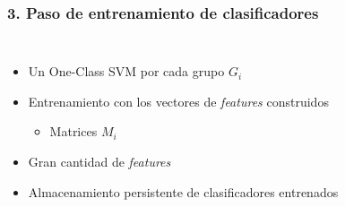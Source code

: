 \begin{frame}
    \frametitle{3. Paso de entrenamiento de clasificadores}

    \begin{columns}
        \begin{itemize}[<2->]
            \item
            Un One-Class SVM por cada grupo $G_{i}$

            \item
            Entrenamiento con los vectores de \textit{features}
            construidos

            \begin{itemize}[<.->]
                \item
                Matrices $M_{i}$
            \end{itemize}

            \item
            Gran cantidad de \textit{features}

            \item
            Almacenamiento persistente de clasificadores entrenados
        \end{itemize}

        \begin{center}
        \end{center}
    \end{columns}
\end{frame}



